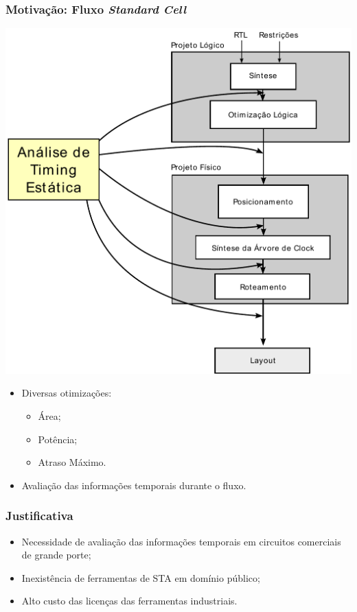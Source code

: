 \documentclass[10pt,a4paper]{beamer}
\begin{document}
		
			\begin{frame}
				\frametitle{Motivação: Fluxo \textit{Standard Cell}}
				\begin{minipage}{0.5 \textwidth}
					\includegraphics[width=\textwidth]{img/fluxo_standard_cell_sta_destacada.pdf}
				\end{minipage}
				\begin{minipage}{0.4 \textwidth}
					\begin{itemize}
						\item Diversas otimizações:
							\begin{itemize}
								\item Área;
								\item Potência;
								\item Atraso Máximo.
								
							\end{itemize}
						\item Avaliação das informações temporais durante o fluxo.
					\end{itemize}
				\end{minipage}
				
			\end{frame}
		
			\begin{frame}[t]
				\frametitle{Justificativa}
				\begin{itemize}
					\item Necessidade de avaliação das informações temporais em circuitos comerciais de grande porte;
					\item Inexistência de ferramentas de STA em domínio público;
					\item Alto custo das licenças das ferramentas industriais.
				\end{itemize}
			\end{frame}
		
\end{document}
